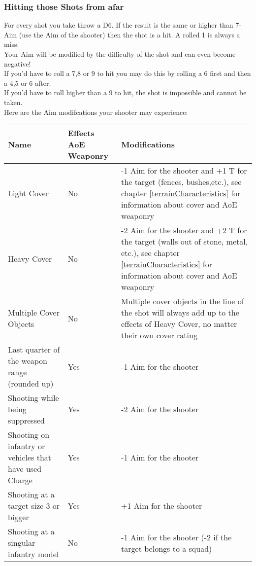 \documentclass[
	11pt,
	toc=bibliography
	]{article}
\begin{document}
\subsubsection{Hitting those Shots from afar}\label{hittingRanged}
For every shot you take throw a D6. If the result is the same or higher than 7-Aim (use the Aim of the shooter) then the shot is a hit. A rolled 1 is always a miss.\\
Your Aim will be modified by the difficulty of the shot and can even become negative!\\
If you'd have to roll a 7,8 or 9 to hit you may do this by rolling a 6 first and then a 4,5 or 6 after.\\
If you'd have to roll higher than a 9 to hit, the shot is impossible and cannot be taken.\\
Here are the Aim modifcations your shooter may experience:
{\renewcommand{\arraystretch}{2}
\begin{longtable}{V{.3\textwidth} V{.14\textwidth} V{.5\textwidth}}
\bf Name & \bf Effects AoE Weaponry & \bf Modifications \\ 
\hline 
Light Cover & No & -1 Aim for the shooter and +1 T for the target (fences, bushes,etc.), see chapter \ref{terrainCharacteristics} for information about cover and AoE weaponry \\ 
Heavy Cover & No & -2 Aim for the shooter and +2 T for the target (walls out of stone, metal, etc.), see chapter \ref{terrainCharacteristics} for information about cover and AoE weaponry\\ 
Multiple Cover Objects & No & Multiple cover objects in the line of the shot will always add up to the effects of Heavy Cover, no matter their own cover rating \\ 
Last quarter of the weapon range (rounded up) & Yes & -1 Aim for the shooter\\
Shooting while being suppressed & Yes & -2 Aim for the shooter\\
Shooting on infantry or vehicles that have used Charge & Yes & -1 Aim for the shooter\\
Shooting at a target size 3 or bigger & Yes & +1 Aim for the shooter\\ 
Shooting at a singular infantry model & No & -1 Aim for the shooter (-2 if the target belongs to a squad)\\
\end{longtable}}
\end{document}
